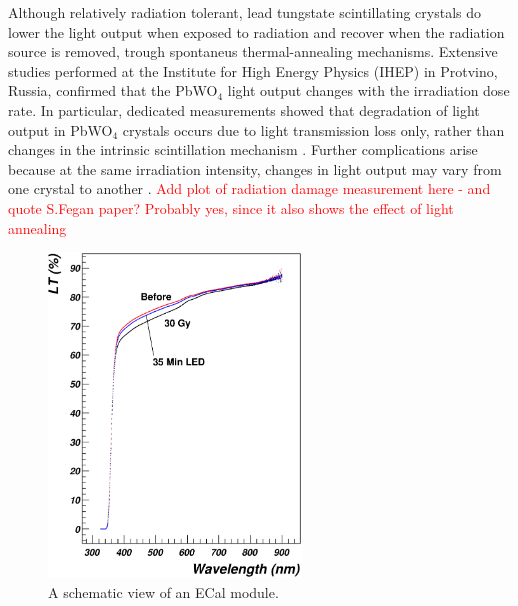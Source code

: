 Although relatively radiation tolerant, lead tungstate scintillating crystals do lower the light output when exposed to radiation and recover when the radiation source is removed, trough spontaneus thermal-annealing mechanisms. Extensive studies performed at the Institute for High Energy Physics (IHEP) in Protvino, Russia, confirmed that the PbWO$_4$ light output changes with the irradiation dose rate. In particular, dedicated measurements showed that degradation of light output in PbWO$_4$ crystals occurs due to light transmission loss only, rather than changes in the intrinsic scintillation mechanism \cite{1}. Further complications arise because at the same irradiation intensity, changes in light output may vary from one crystal to another \cite{2} \cite{3}. \textcolor{red}{Add plot of radiation damage measurement here - and quote S.Fegan paper? Probably yes, since it also shows the effect of light annealing}

\begin{figure}[ht!]
\centering
\includegraphics[width=0.60\textwidth]{LT_CrystalHPS_rec.eps}
\caption{A schematic view of an ECal module.}
\label{CrystalRadDamage}
\end{figure}
 


